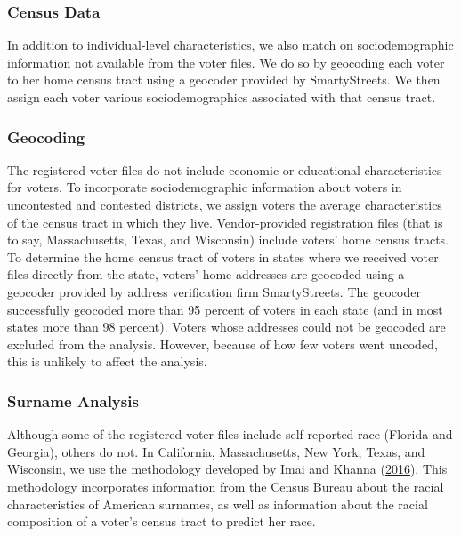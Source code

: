 \documentclass[
  12pt,
]{article}
\begin{document}
\hypertarget{census-data}{%
\subsubsection*{Census Data}\label{census-data}}

In addition to individual-level characteristics, we also match on sociodemographic information not available from the voter files. We do so by geocoding each voter to her home census tract using a geocoder provided by SmartyStreets. We then assign each voter various sociodemographics associated with that census tract.

\hypertarget{geocoding}{%
\subsubsection*{Geocoding}\label{geocoding}}

The registered voter files do not include economic or educational characteristics for voters. To incorporate sociodemographic information about voters in uncontested and contested districts, we assign voters the average characteristics of the census tract in which they live. Vendor-provided registration files (that is to say, Massachusetts, Texas, and Wisconsin) include voters' home census tracts. To determine the home census tract of voters in states where we received voter files directly from the state, voters' home addresses are geocoded using a geocoder provided by address verification firm SmartyStreets. The geocoder successfully geocoded more than 95 percent of voters in each state (and in most states more than 98 percent). Voters whose addresses could not be geocoded are excluded from the analysis. However, because of how few voters went uncoded, this is unlikely to affect the analysis.

\hypertarget{surname-analysis}{%
\subsubsection*{Surname Analysis}\label{surname-analysis}}

Although some of the registered voter files include self-reported race (Florida and Georgia), others do not. In California, Massachusetts, New York, Texas, and Wisconsin, we use the methodology developed by Imai and Khanna (\protect\hyperlink{ref-Imai2016}{2016}). This methodology incorporates information from the Census Bureau about the racial characteristics of American surnames, as well as information about the racial composition of a voter's census tract to predict her race.
\end{document}
